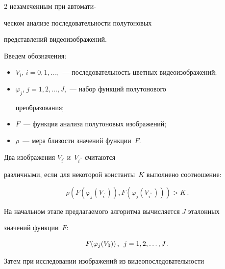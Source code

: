 \begin{multicols}{2}
незамеченным при автомати-\linebreak\vspace*{-12pt}



\pagebreak



\noindent

ческом анализе последовательности полутоновых

представлений видеоизображений.



  Введем обозначения:

\begin{itemize}

\item  $V_i$, $i = 0, 1, \ldots,$~--- последовательность цветных видеоизображений;

\item

  $\varphi_j$, $j = 1, 2, \ldots , J$,~--- набор функций полутонового

преобразования;

\item

  $F$~--- функция анализа полутоновых изображений;

\item

  $\rho$~--- мера близости значений функции~$F$.

  \end{itemize}



  Два изображения $V_{i^\prime}$ и~$V_{i^{\prime\prime}}$ считаются

различными, если для некоторой константы~$K$ выполнено соотношение:

  $$

  \rho (F (\varphi_j(V_{i^\prime})), F(\varphi_j(V_{i^{\prime\prime}})))>K\,.

  $$



  На начальном этапе предлагаемого алгоритма вычисляется $J$ эталонных

значений функции~$F$:

  $$

F(\varphi_j(V_0))\,,\enskip  j = 1, 2, \ldots , J\,.

$$



  Затем при исследовании изображений из видеопоследовательности


\end{multicols}
